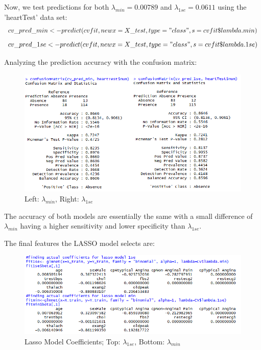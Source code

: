 \documentclass[12pt]{article}
\begin{document}
Now, we test predictions for both $\lambda_{min}=0.00789$ and $\lambda_{1se}=0.0611$ using the 'heartTest' data set:
\[cv\_pred\_min <-predict(cvfit, newx = X\_test, type = "class", s = cvfit\$lambda.min)\]
\[cv\_pred\_1se <-predict(cvfit, newx = X\_test, type = "class", s = cvfit\$lambda.1se)\]

Analyzing the prediction accuracy with the confusion matrix: 

\begin{figure}[h!]
\begin{center}
\includegraphics[scale=.75]{confusionmatrix}
\caption{Left: $\lambda_{min}$, Right: $\lambda_{1se}$}
\end{center}
\end{figure}

The accuracy of both models are essentially the same with a small difference of $\lambda_{min}$ having a higher sensitivity and lower specificity than $\lambda_{1se}$. 

\pagebreak
The final features the LASSO model selects are: 
\begin{figure}[h!]
\begin{center}
\includegraphics[scale=.75]{lassocoefficients}
\caption{Lasso Model Coefficients; Top:  $\lambda_{1se}$, Bottom: $\lambda_{min}$}
\end{center}
\end{figure}
\end{document}
